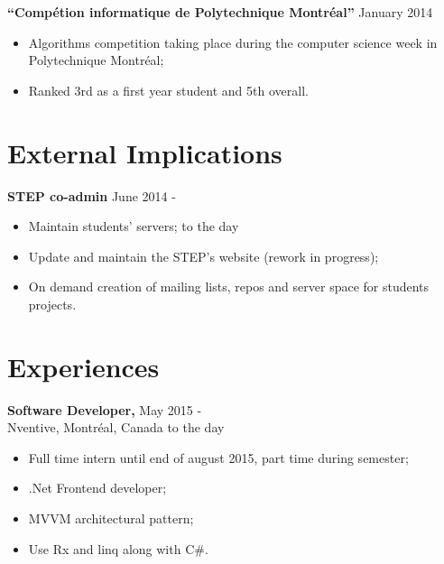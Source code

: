 \documentclass[margin]{res}
\begin{document}
\begin{resume}
  {\bf ``Comp\'{e}tion informatique de Polytechnique Montr\'{e}al''} \hfill January 2014
  \begin{itemize} \itemsep -2pt
  \item Algorithms competition taking place during the computer science week in Polytechnique  Montr\'{e}al;
  \item Ranked 3rd as a first year student and 5th overall.
  \end{itemize}


  \section{External Implications}
  
  {\bf STEP co-admin} \hfill June 2014 -
  \begin{itemize} \itemsep -2pt
  \item Maintain students' servers; \hfill to the day
  \item Update and maintain the STEP's website (rework in progress);
  \item On demand creation of mailing lists, repos and server space for students projects.
  \end{itemize}
  
  
  
  \section{Experiences}

  {\bf Software Developer,} \hfill May 2015 -\\
  Nventive, Montr\'eal, Canada \hfill to the day
  \begin{itemize} \itemsep -2pt  %
  \item Full time intern until end of august 2015, part time during semester;
  \item .Net Frontend developer;
  \item MVVM  architectural pattern;
  \item Use Rx and linq along with C\#.
  \end{itemize}
  

\end{resume}
\end{document}
